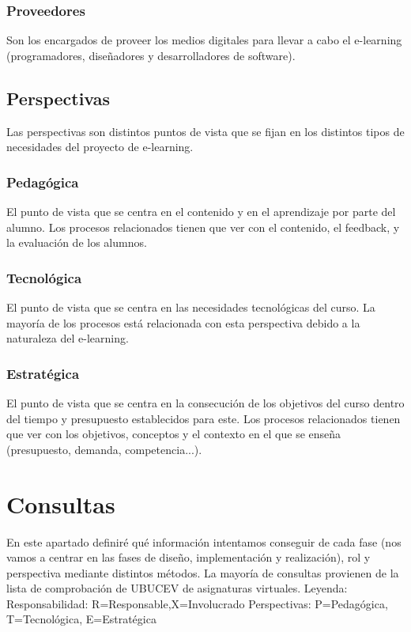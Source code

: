 \subsubsection{Proveedores}
Son los encargados de proveer los medios digitales para llevar a cabo el e-learning (programadores, diseñadores y desarrolladores de software).

\subsection{Perspectivas}
Las perspectivas son distintos puntos de vista que se fijan en los distintos tipos de necesidades del proyecto de e-learning.
\subsubsection{Pedagógica}
El punto de vista que se centra en el contenido y en el aprendizaje por parte del alumno. Los procesos relacionados tienen que ver con el contenido, el feedback, y la evaluación de los alumnos.

\subsubsection{Tecnológica}
El punto de vista que se centra en las necesidades tecnológicas del curso. La mayoría de los procesos está relacionada con esta perspectiva debido a la naturaleza del e-learning.

\subsubsection{Estratégica}
El punto de vista que se centra en la consecución de los objetivos del curso dentro del tiempo y presupuesto establecidos para este. Los procesos relacionados tienen que ver con los objetivos, conceptos y el contexto en el que se enseña (presupuesto, demanda, competencia...).


\section{Consultas}
En este apartado definiré qué información intentamos conseguir de cada fase (nos vamos a centrar en las fases de diseño, implementación y realización), rol y perspectiva mediante distintos métodos. La mayoría de consultas provienen de la lista de comprobación de UBUCEV de asignaturas virtuales.
Leyenda:
Responsabilidad: R=Responsable,X=Involucrado
Perspectivas: P=Pedagógica, T=Tecnológica, E=Estratégica

